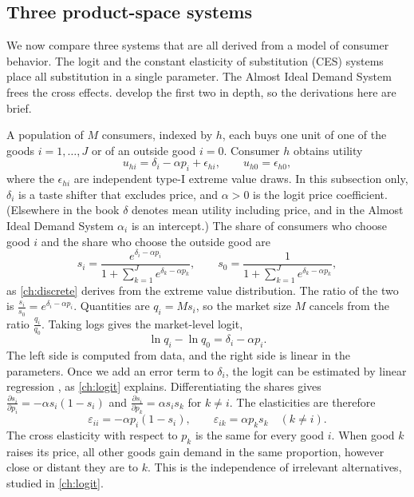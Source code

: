 \subsection{Three product-space systems}\label{sec:05-three-systems}

We now compare three systems that are all derived from a model of consumer behavior. The logit and the
constant elasticity of substitution (CES) systems place all substitution in a single parameter. The Almost
Ideal Demand System frees the cross effects.  develop the first two in depth, so
the derivations here are brief.

A population of $M$ consumers, indexed by $h$, each buys one unit of one of the goods $i = 1, \dots, J$ or
of an outside good $i = 0$. Consumer $h$ obtains utility
\begin{equation*}
u_{hi} = \delta_i - \alpha p_i + \epsilon_{hi}, \qquad u_{h0} = \epsilon_{h0},
\end{equation*}
where the $\epsilon_{hi}$ are independent type-I extreme value draws. In this subsection only, $\delta_i$
is a taste shifter that excludes price, and $\alpha > 0$ is the logit price coefficient. (Elsewhere in the
book $\delta$ denotes mean utility including price, and in the Almost Ideal Demand System $\alpha_i$ is an
intercept.) The share of consumers who choose good $i$ and the share who choose the outside good are
\begin{equation*}
s_i = \frac{e^{\delta_i - \alpha p_i}}{1 + \sum_{k=1}^J e^{\delta_k - \alpha p_k}}, \qquad
s_0 = \frac{1}{1 + \sum_{k=1}^J e^{\delta_k - \alpha p_k}},
\end{equation*}
as \cref{ch:discrete} derives from the extreme value distribution. The ratio of the two is
$\frac{s_i}{s_0} = e^{\delta_i - \alpha p_i}$. Quantities are $q_i = Ms_i$, so the market size $M$ cancels
from the ratio $\frac{q_i}{q_0}$. Taking logs gives the market-level logit,
\begin{equation}\label{eq:05-logit}
\ln q_i - \ln q_0 = \delta_i - \alpha p_i .
\end{equation}
The left side is computed from data, and the right side is linear in the parameters. Once we add an error
term to $\delta_i$, the logit can be estimated by linear regression \citep{Berry1994}, as \cref{ch:logit}
explains. Differentiating the shares gives $\frac{\partial s_i}{\partial p_i} = -\alpha s_i(1-s_i)$ and
$\frac{\partial s_i}{\partial p_k} = \alpha s_is_k$ for $k \neq i$. The elasticities are therefore
\begin{equation}\label{eq:05-logit-elast}
\varepsilon_{ii} = -\alpha p_i(1 - s_i), \qquad \varepsilon_{ik} = \alpha p_ks_k \quad (k \neq i).
\end{equation}
The cross elasticity with respect to $p_k$ is the same for every good $i$. When good $k$ raises its price,
all other goods gain demand in the same proportion, however close or distant they are to $k$. This is the
independence of irrelevant alternatives, studied in \cref{ch:logit}.

